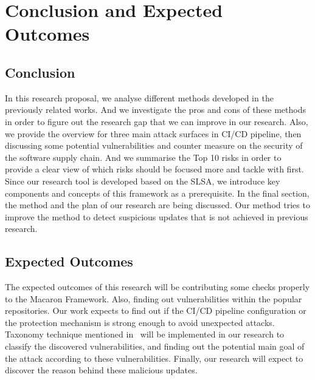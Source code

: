 \section{Conclusion and Expected Outcomes}
\subsection{Conclusion}
In this research proposal, we analyse different methods developed in the previously related works.
And we investigate the pros and cons of these methods in order to figure out the research gap that 
we can improve in our research. Also, we provide the overview for three main attack surfaces in CI/CD
pipeline, then discussing some potential vulnerabilities and counter measure on the security of the software
supply chain. And we summarise the Top 10 risks in order to provide a clear view of which risks should
be focused more and tackle with first. 
Since our research tool is developed based on the SLSA, we introduce key components and concepts of this 
framework as a prerequisite.
In the final section, the method and the plan of our research are being discussed. Our method tries to 
improve the method to detect suspicious updates that is not achieved in previous research.
\subsection{Expected Outcomes}
The expected outcomes of this research will be contributing some checks properly to the Macaron 
Framework. Also, finding out vulnerabilities within the popular repositories. Our work expects to 
find out if the CI/CD pipeline configuration or the protection mechanism is strong enough to 
avoid unexpected attacks. Taxonomy technique mentioned in~\cite{ohm2020backstabber} will be 
implemented in our research to classify the discovered vulnerabilities, and finding out the potential
main goal of the attack according to these vulnerabilities. Finally, our research will expect to 
discover the reason behind these malicious updates.   